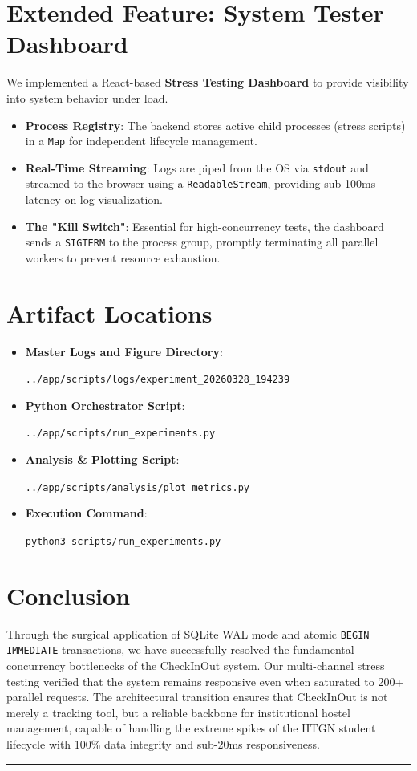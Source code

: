 \documentclass[sigconf]{acmart}
\begin{document}
\section{Extended Feature: System Tester Dashboard}
We implemented a React-based \textbf{Stress Testing Dashboard} to provide visibility into system behavior under load.
\begin{itemize}[leftmargin=*]
    \item \textbf{Process Registry}: The backend stores active child processes (stress scripts) in a \texttt{Map} for independent lifecycle management.
    \item \textbf{Real-Time Streaming}: Logs are piped from the OS via \texttt{stdout} and streamed to the browser using a \texttt{ReadableStream}, providing sub-100ms latency on log visualization.
    \item \textbf{The "Kill Switch"}: Essential for high-concurrency tests, the dashboard sends a \texttt{SIGTERM} to the process group, promptly terminating all parallel workers to prevent resource exhaustion.
\end{itemize}

\section{Artifact Locations}
\begin{itemize}
    \item \textbf{Master Logs and Figure Directory}: 

    \texttt{../app/scripts/logs/experiment\_20260328\_194239}
    \item \textbf{Python Orchestrator Script}: 
    
    \texttt{../app/scripts/run\_experiments.py}
    \item \textbf{Analysis \& Plotting Script}: 
    
    \texttt{../app/scripts/analysis/plot\_metrics.py}
    \item \textbf{Execution Command}: 
    
    \texttt{python3 scripts/run\_experiments.py}
\end{itemize}

\section{Conclusion}
Through the surgical application of SQLite WAL mode and atomic \texttt{BEGIN IMMEDIATE} transactions, we have successfully resolved the fundamental concurrency bottlenecks of the CheckInOut system. Our multi-channel stress testing verified that the system remains responsive even when saturated to 200+ parallel requests. The architectural transition ensures that CheckInOut is not merely a tracking tool, but a reliable backbone for institutional hostel management, capable of handling the extreme spikes of the IITGN student lifecycle with 100\% data integrity and sub-20ms responsiveness.




\noindent\rule{\columnwidth}{0.5pt}
\end{document}
